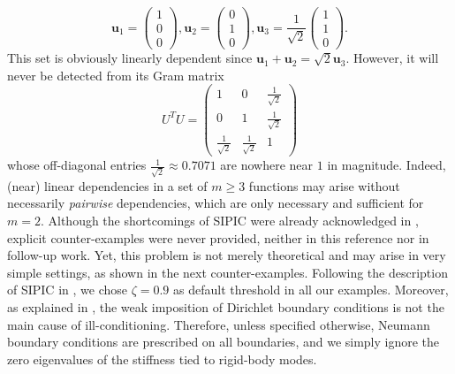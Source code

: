 \documentclass{article}
\numberwithin{equation}{section}
\theoremstyle{definition}
\begin{document}
\begin{equation*}
    \bm{u}_1=
    \begin{pmatrix}
        1 \\
        0 \\
        0
    \end{pmatrix},
    \bm{u}_2=
    \begin{pmatrix}
        0 \\
        1 \\
        0
    \end{pmatrix},
    \bm{u}_3=\frac{1}{\sqrt{2}}
    \begin{pmatrix}
        1 \\
        1 \\
        0
    \end{pmatrix}.
\end{equation*}
This set is obviously linearly dependent since $\bm{u}_1+\bm{u}_2=\sqrt{2}\bm{u}_3$. However, it will never be detected from its Gram matrix
\begin{equation*}
    U^TU=
    \begin{pmatrix}
        1 & 0 & \frac{1}{\sqrt{2}} \\
        0 & 1 & \frac{1}{\sqrt{2}} \\
        \frac{1}{\sqrt{2}} & \frac{1}{\sqrt{2}} & 1
    \end{pmatrix}
\end{equation*}
whose off-diagonal entries $\frac{1}{\sqrt{2}} \approx 0.7071$ are nowhere near $1$ in magnitude. Indeed, (near) linear dependencies in a set of $m \geq 3$ functions may arise without necessarily \emph{pairwise} dependencies, which are only necessary and sufficient for $m=2$. Although the shortcomings of SIPIC were already acknowledged in \cite[Remark 3.1]{de2019preconditioning}, explicit counter-examples were never provided, neither in this reference nor in follow-up work. Yet, this problem is not merely theoretical and may arise in very simple settings, as shown in the next counter-examples. Following the description of SIPIC in \cite{de2017condition}, we chose $\zeta = 0.9$ as default threshold in all our examples. Moreover, as explained in , the weak imposition of Dirichlet boundary conditions is not the main cause of ill-conditioning. Therefore, unless specified otherwise, Neumann boundary conditions are prescribed on all boundaries, and we simply ignore the zero eigenvalues of the stiffness tied to rigid-body modes.
\end{document}
